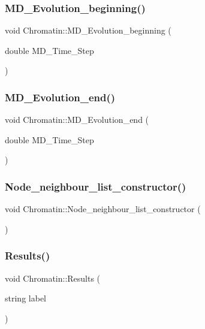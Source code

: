 \subsubsection{\texorpdfstring{MD\_Evolution\_beginning()}{MD\_Evolution\_beginning()}}
{\footnotesize\ttfamily void Chromatin\+::\+M\+D\+\_\+\+Evolution\+\_\+beginning (\begin{DoxyParamCaption}\item[{double}]{M\+D\+\_\+\+Time\+\_\+\+Step }\end{DoxyParamCaption})}

\mbox{\label{classChromatin_aeb3e8a20562ba32ee888079d1c65c4c2}} 
\subsubsection{\texorpdfstring{MD\_Evolution\_end()}{MD\_Evolution\_end()}}
{\footnotesize\ttfamily void Chromatin\+::\+M\+D\+\_\+\+Evolution\+\_\+end (\begin{DoxyParamCaption}\item[{double}]{M\+D\+\_\+\+Time\+\_\+\+Step }\end{DoxyParamCaption})}

\mbox{\label{classChromatin_ae8481ef6ce172d5e2ae50b252d234cc9}} 
\subsubsection{\texorpdfstring{Node\_neighbour\_list\_constructor()}{Node\_neighbour\_list\_constructor()}}
{\footnotesize\ttfamily void Chromatin\+::\+Node\+\_\+neighbour\+\_\+list\+\_\+constructor (\begin{DoxyParamCaption}{ }\end{DoxyParamCaption})}

\mbox{\label{classChromatin_a93559682020c26033dc0b4cdbff774f9}} 
\subsubsection{\texorpdfstring{Results()}{Results()}}
{\footnotesize\ttfamily void Chromatin\+::\+Results (\begin{DoxyParamCaption}\item[{string}]{label }\end{DoxyParamCaption})}

